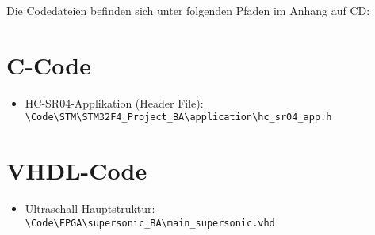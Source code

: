 Die Codedateien befinden sich unter folgenden Pfaden im Anhang auf CD:

\section{C-Code}
\begin{itemize}
\item HC-SR04-Applikation (Header File): \lstinline{\Code\STM\STM32F4_Project_BA\application\hc_sr04_app.h}
\end{itemize}

\section{VHDL-Code}
\begin{itemize}
\item Ultraschall-Hauptstruktur: \lstinline{\Code\FPGA\supersonic_BA\main_supersonic.vhd}
\end{itemize}